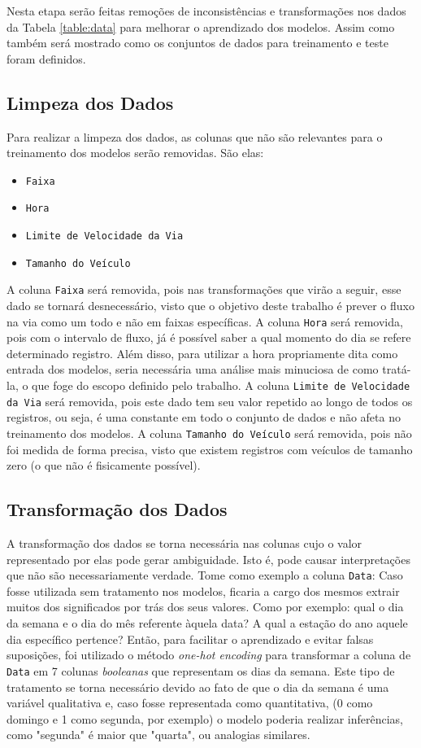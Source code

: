 Nesta etapa serão feitas remoções de inconsistências e transformações nos dados da Tabela \ref{table:data} para melhorar o aprendizado dos modelos. Assim como também será mostrado como os conjuntos de dados para treinamento e teste foram definidos.
\subsection{Limpeza dos Dados}


Para realizar a limpeza dos dados, as colunas que não são relevantes para o treinamento dos modelos serão removidas. São elas:
\begin{itemize}
    \item \texttt{Faixa}
    \item  \texttt{Hora}
    \item \texttt{Limite de Velocidade da Via}
    \item  \texttt{Tamanho do Veículo}
\end{itemize}

A coluna \texttt{Faixa} será removida, pois nas transformações que virão a seguir, esse dado se tornará desnecessário, visto que o objetivo deste trabalho é prever o fluxo na via como um todo e não em faixas específicas. A coluna \texttt{Hora} será removida, pois com o intervalo de fluxo, já é possível saber a qual momento do dia se refere determinado registro. Além disso, para utilizar a hora propriamente dita como entrada dos modelos, seria necessária uma análise mais minuciosa de como tratá-la, o que foge do escopo definido pelo trabalho. A coluna \texttt{Limite de Velocidade da Via} será removida, pois este dado tem seu valor repetido ao longo de todos os registros, ou seja, é uma constante em todo o conjunto de dados e não afeta no treinamento dos modelos. A coluna \texttt{Tamanho do Veículo} será removida, pois não foi medida de forma precisa, visto que existem registros com veículos de tamanho zero (o que não é fisicamente possível).

\subsection{Transformação dos Dados}

A transformação dos dados se torna necessária nas colunas cujo o valor representado por elas pode gerar ambiguidade. Isto é, pode causar interpretações que não são necessariamente verdade. Tome como exemplo a coluna \texttt{Data}: Caso fosse utilizada sem tratamento nos modelos, ficaria a cargo dos mesmos extrair muitos dos significados por trás dos seus valores. Como por exemplo: qual o dia da semana e o dia do mês referente àquela data? A qual a estação do ano aquele dia específico pertence? Então, para facilitar o aprendizado e evitar falsas suposições, foi utilizado o método \textit{one-hot encoding} para transformar a coluna de \texttt{Data} em 7 colunas \textit{booleanas} que representam os dias da semana. Este tipo de tratamento se torna necessário devido ao fato de que o dia da semana é uma variável qualitativa e, caso fosse representada como quantitativa, (0 como domingo e 1 como segunda, por exemplo) o modelo poderia realizar inferências, como "segunda" é maior que "quarta", ou analogias similares.

